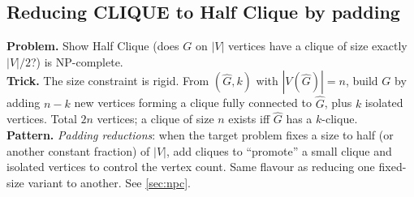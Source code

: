 \subsection{Reducing CLIQUE to Half Clique by padding}
\textbf{Problem.} Show Half Clique (does $G$ on $|V|$ vertices have a clique of size exactly $|V|/2$?) is NP-complete.\\
\textbf{Trick.} The size constraint is rigid. From $(\hat G, k)$ with $|V(\hat G)| = n$, build $G$ by adding $n-k$ new vertices forming a clique fully connected to $\hat G$, plus $k$ isolated vertices. Total $2n$ vertices; a clique of size $n$ exists iff $\hat G$ has a $k$-clique.\\
\textbf{Pattern.} \emph{Padding reductions}: when the target problem fixes a size to half (or another constant fraction) of $|V|$, add cliques to ``promote'' a small clique and isolated vertices to control the vertex count. Same flavour as reducing one fixed-size variant to another. See \cref{sec:npc}.

